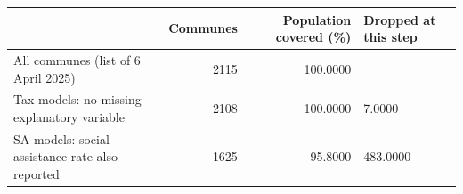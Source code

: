 \begin{tabular}{lrrl}
\toprule
 & Communes & Population covered (\%) & Dropped at this step \\
\midrule
All communes (list of 6 April 2025) & 2115 & 100.0000 &  \\
Tax models: no missing explanatory variable & 2108 & 100.0000 & 7.0000 \\
SA models: social assistance rate also reported & 1625 & 95.8000 & 483.0000 \\
\bottomrule
\end{tabular}
